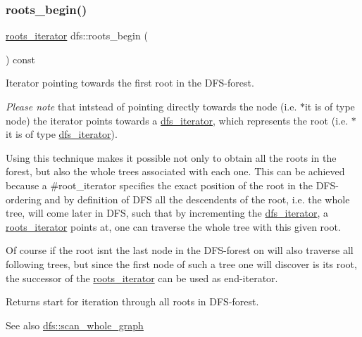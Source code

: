 \subsubsection{\texorpdfstring{roots\+\_\+begin()}{roots\_begin()}}
{\footnotesize\ttfamily \mbox{\hyperlink{classdfs_a1ea6e8eb2766ac95ac48a8523359065a}{roots\+\_\+iterator}} dfs\+::roots\+\_\+begin (\begin{DoxyParamCaption}{ }\end{DoxyParamCaption}) const\hspace{0.3cm}{\ttfamily [inline]}}



Iterator pointing towards the first root in the D\+F\+S-\/forest. 

{\itshape Please note} that intstead of pointing directly towards the node (i.\+e. {\ttfamily $\ast$it} is of type node) the iterator points towards a \mbox{\hyperlink{classdfs_a15fe023a5a1f7ddda00f3d87110d9a32}{dfs\+\_\+iterator}}, which represents the root (i.\+e. {\ttfamily $\ast$it} is of type \mbox{\hyperlink{classdfs_a15fe023a5a1f7ddda00f3d87110d9a32}{dfs\+\_\+iterator}}).

Using this technique makes it possible not only to obtain all the roots in the forest, but also the whole trees associated with each one. This can be achieved because a \#root\+\_\+iterator specifies the exact position of the root in the D\+F\+S-\/ordering and by definition of D\+FS all the descendents of the root, i.\+e. the whole tree, will come later in D\+FS, such that by incrementing the \mbox{\hyperlink{classdfs_a15fe023a5a1f7ddda00f3d87110d9a32}{dfs\+\_\+iterator}}, a \mbox{\hyperlink{classdfs_a1ea6e8eb2766ac95ac48a8523359065a}{roots\+\_\+iterator}} points at, one can traverse the whole tree with this given root.

Of course if the root isn\textquotesingle{}t the last node in the D\+F\+S-\/forest on will also traverse all following trees, but since the first node of such a tree one will discover is its root, the successor of the \mbox{\hyperlink{classdfs_a1ea6e8eb2766ac95ac48a8523359065a}{roots\+\_\+iterator}} can be used as end-\/iterator.

\begin{DoxyReturn}{Returns}
start for iteration through all roots in D\+F\+S-\/forest. 
\end{DoxyReturn}
\begin{DoxySeeAlso}{See also}
\mbox{\hyperlink{classdfs_aa7c864a6f3a120720138b187b3ed95b5}{dfs\+::scan\+\_\+whole\+\_\+graph}} 
\end{DoxySeeAlso}


